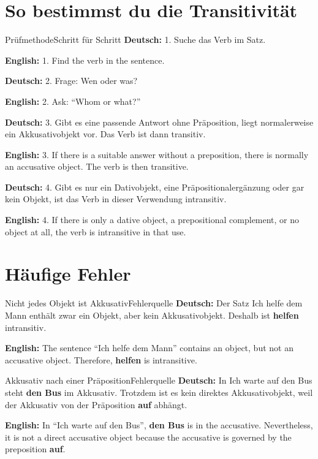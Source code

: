 \documentclass[a4paper,11pt]{article}
\newcommand{\GermanText}[1]{\textbf{Deutsch: }#1\par}
\newcommand{\EnglishText}[1]{{\small\color{SoftGray}\textbf{English: }#1\par}}
\begin{document}
    
    \section{So bestimmst du die Transitivität}
        
        \begin{grammarentry}{Prüfmethode}{Schritt für Schritt}
            \GermanText{1. Suche das Verb im Satz.}
            \EnglishText{1. Find the verb in the sentence.}
            
            \GermanText{2. Frage: \glqq Wen oder was?\grqq}
            \EnglishText{2. Ask: ``Whom or what?''}
            
            \GermanText{3. Gibt es eine passende Antwort ohne Präposition, liegt normalerweise ein Akkusativobjekt vor. Das Verb ist dann transitiv.}
            \EnglishText{3. If there is a suitable answer without a preposition, there is normally an accusative object. The verb is then transitive.}
            
            \GermanText{4. Gibt es nur ein Dativobjekt, eine Präpositionalergänzung oder gar kein Objekt, ist das Verb in dieser Verwendung intransitiv.}
            \EnglishText{4. If there is only a dative object, a prepositional complement, or no object at all, the verb is intransitive in that use.}
        \end{grammarentry}
    
    
    \section{Häufige Fehler}
        
        \begin{grammarentry}{Nicht jedes Objekt ist Akkusativ}{Fehlerquelle}
            \GermanText{Der Satz \glqq Ich helfe dem Mann\grqq{} enthält zwar ein Objekt, aber kein Akkusativobjekt. Deshalb ist \textbf{helfen} intransitiv.}
            \EnglishText{The sentence ``Ich helfe dem Mann'' contains an object, but not an accusative object. Therefore, \textbf{helfen} is intransitive.}
        \end{grammarentry}
        
        \begin{grammarentry}{Akkusativ nach einer Präposition}{Fehlerquelle}
            \GermanText{In \glqq Ich warte auf den Bus\grqq{} steht \textbf{den Bus} im Akkusativ. Trotzdem ist es kein direktes Akkusativobjekt, weil der Akkusativ von der Präposition \textbf{auf} abhängt.}
            \EnglishText{In ``Ich warte auf den Bus'', \textbf{den Bus} is in the accusative. Nevertheless, it is not a direct accusative object because the accusative is governed by the preposition \textbf{auf}.}
        \end{grammarentry}
    
\end{document}
